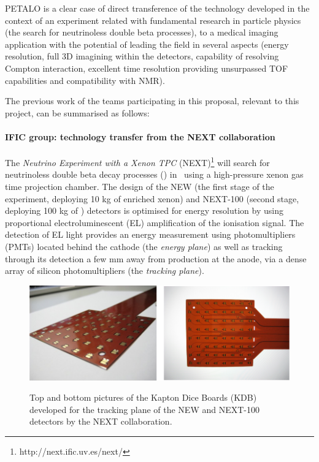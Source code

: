 PETALO is a clear case of direct transference of the technology developed in the context of an experiment related with fundamental research in particle physics (the search for neutrinoless double beta processes), to a medical imaging application with the potential of leading the field in several aspects (energy resolution, full 3D imagining within the detectors, capability of resolving Compton interaction, excellent time resolution providing unsurpassed TOF capabilities and compatibility with NMR).  

The previous work of the teams participating in this proposal, relevant to this project, can be summarised as follows:

\paragraph{IFIC group: technology transfer from the NEXT collaboration}

The \emph{Neutrino Experiment with a Xenon TPC} (NEXT)\footnote{http://next.ific.uv.es/next/} will search for neutrinoless double beta decay processes (\bbonu) in \XE\ using a  high-pressure xenon gas time projection chamber. The design of the NEW (the first stage of the experiment, deploying 10 kg of enriched xenon) and NEXT-100 (second stage, deploying 100 kg of \XE) detectors is optimised for energy resolution by using proportional electroluminescent (EL) amplification of the ionisation signal. The detection of EL light provides an energy measurement using photomultipliers (PMTs) located behind the cathode (the \emph{energy plane}) as well as tracking through its detection a few mm away from production at the anode, via a dense array of silicon photomultipliers (the \emph{tracking plane}).

\begin{figure}[!htb]
	\centering
	\includegraphics[scale=0.9]{img/KDB2.png}\\
	\caption{\label{fig.KDB} Top and bottom pictures of the Kapton Dice Boards (KDB) developed for the tracking plane of the NEW and NEXT-100 detectors by the NEXT collaboration.}
\end{figure}

